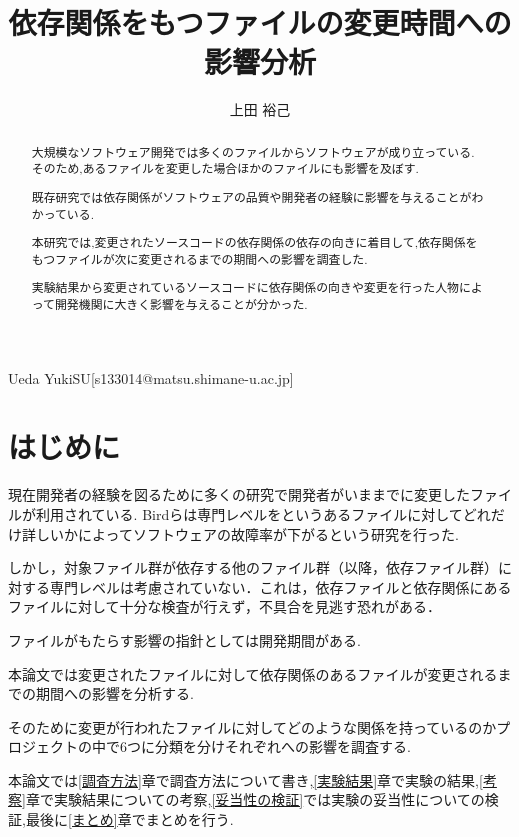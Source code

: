 \documentclass[submit,ses,noauthor]{ipsj} %
\begin{document}
\title{依存関係をもつファイルの変更時間への影響分析}

\etitle{}



\author{上田 裕己}{Ueda Yuki}{SU}[s133014@matsu.shimane-u.ac.jp]

\begin{abstract}
大規模なソフトウェア開発では多くのファイルからソフトウェアが成り立っている.
そのため,あるファイルを変更した場合ほかのファイルにも影響を及ぼす.

既存研究では依存関係がソフトウェアの品質や開発者の経験に影響を与えることがわかっている.

本研究では,変更されたソースコードの依存関係の依存の向きに着目して,依存関係をもつファイルが次に変更されるまでの期間への影響を調査した.
 
実験結果から変更されているソースコードに依存関係の向きや変更を行った人物によって開発機関に大きく影響を与えることが分かった.
  

\end{abstract}

\maketitle

\section{はじめに} 
現在開発者の経験を図るために多くの研究で開発者がいままでに変更したファイルが利用されている.
Bird\cite{Bird}らは専門レベルをというあるファイルに対してどれだけ詳しいかによってソフトウェアの故障率が下がるという研究を行った.


しかし，対象ファイル群が依存する他のファイル群（以降，依存ファイル群）に対する専門レベルは考慮されていない．これは，依存ファイルと依存関係にあるファイルに対して十分な検査が行えず，不具合を見逃す恐れがある．

ファイルがもたらす影響の指針としては開発期間がある.

本論文では変更されたファイルに対して依存関係のあるファイルが変更されるまでの期間への影響を分析する.

そのために変更が行われたファイルに対してどのような関係を持っているのかプロジェクトの中で6つに分類を分けそれぞれへの影響を調査する.



本論文では\ref{調査方法}章で調査方法について書き,\ref{実験結果}章で実験の結果,\ref{考察}章で実験結果についての考察,\ref{妥当性の検証}では実験の妥当性についての検証,最後に\ref{まとめ}章でまとめを行う.
\end{document}
